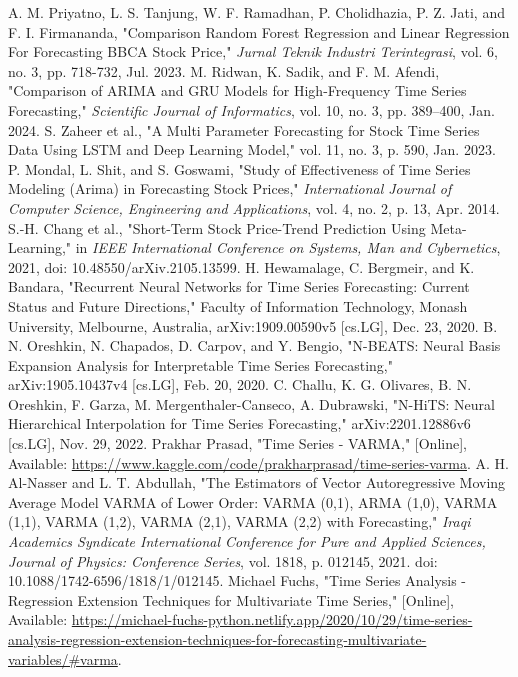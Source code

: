 \begin{thebibliography}{00}
     A. M. Priyatno, L. S. Tanjung, W. F. Ramadhan, P. Cholidhazia, P. Z. Jati, and F. I. Firmananda, "Comparison Random Forest Regression and Linear Regression For Forecasting BBCA Stock Price," \textit{Jurnal Teknik Industri Terintegrasi}, vol. 6, no. 3, pp. 718-732, Jul. 2023.
     M. Ridwan, K. Sadik, and F. M. Afendi, "Comparison of ARIMA and GRU Models for High-Frequency Time Series Forecasting," \textit{Scientific Journal of Informatics}, vol. 10, no. 3, pp. 389–400, Jan. 2024.
     S. Zaheer et al., "A Multi Parameter Forecasting for Stock Time Series Data Using LSTM and Deep Learning Model," vol. 11, no. 3, p. 590, Jan. 2023.
     P. Mondal, L. Shit, and S. Goswami, "Study of Effectiveness of Time Series Modeling (Arima) in Forecasting Stock Prices," \textit{International Journal of Computer Science, Engineering and Applications}, vol. 4, no. 2, p. 13, Apr. 2014.
     S.-H. Chang et al., "Short-Term Stock Price-Trend Prediction Using Meta-Learning," in \textit{IEEE International Conference on Systems, Man and Cybernetics}, 2021, doi: 10.48550/arXiv.2105.13599.
     H. Hewamalage, C. Bergmeir, and K. Bandara, "Recurrent Neural Networks for Time Series Forecasting: Current Status and Future Directions," Faculty of Information Technology, Monash University, Melbourne, Australia, arXiv:1909.00590v5 [cs.LG], Dec. 23, 2020.
     B. N. Oreshkin, N. Chapados, D. Carpov, and Y. Bengio, "N-BEATS: Neural Basis Expansion Analysis for Interpretable Time Series Forecasting," arXiv:1905.10437v4 [cs.LG], Feb. 20, 2020.
     C. Challu, K. G. Olivares, B. N. Oreshkin, F. Garza, M. Mergenthaler-Canseco, A. Dubrawski, "N-HiTS: Neural Hierarchical Interpolation for Time Series Forecasting," arXiv:2201.12886v6 [cs.LG], Nov. 29, 2022.
     Prakhar Prasad, "Time Series - VARMA," [Online], Available: \href{https://www.kaggle.com/code/prakharprasad/time-series-varma}{https://www.kaggle.com/code/prakharprasad/time-series-varma}.
     A. H. Al-Nasser and L. T. Abdullah, "The Estimators of Vector Autoregressive Moving Average Model VARMA of Lower Order: VARMA (0,1), ARMA (1,0), VARMA (1,1), VARMA (1,2), VARMA (2,1), VARMA (2,2) with Forecasting," \textit{Iraqi Academics Syndicate International Conference for Pure and Applied Sciences, Journal of Physics: Conference Series}, vol. 1818, p. 012145, 2021. doi: 10.1088/1742-6596/1818/1/012145.
     Michael Fuchs, "Time Series Analysis - Regression Extension Techniques for Multivariate Time Series," [Online], Available: \href{https://michael-fuchs-python.netlify.app/2020/10/29/time-series-analysis-regression-extension-techniques-for-forecasting-multivariate-variables/#varma}{https://michael-fuchs-python.netlify.app/2020/10/29/time-series-analysis-regression-extension-techniques-for-forecasting-multivariate-variables/\#varma}.


\end{thebibliography}
